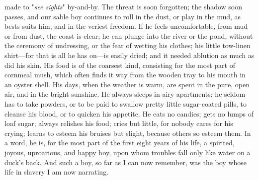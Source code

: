 made to "\emph{see sights}" by-and-by. The threat is soon forgotten; the
shadow soon passes, and our sable boy continues to roll in the dust, or
play in the mud, as bests suits him, and in the veriest freedom. If he
feels uncomfortable, from mud or from dust, the coast is clear; he can
plunge into the river or the pond, without the ceremony of undressing,
or the fear {}of wetting his clothes; his little tow-linen shirt---for
that is all he has on---is easily dried; and it needed ablution as much
as did his skin. His food is of the coarsest kind, consisting for the
most part of cornmeal mush, which often finds it way from the wooden
tray to his mouth in an oyster shell. His days, when the weather is
warm, are spent in the pure, open air, and in the bright sunshine. He
always sleeps in airy apartments; he seldom has to take powders, or to
be paid to swallow pretty little sugar-coated pills, to cleanse his
blood, or to quicken his appetite. He eats no candies; gets no lumps of
loaf sugar; always relishes his food; cries but little, for nobody cares
for his crying; learns to esteem his bruises but slight, because others
so esteem them. In a word, he is, for the most part of the first eight
years of his life, a spirited, joyous, uproarious, and happy boy, upon
whom troubles fall only like water on a duck's back. And such a boy, so
far as I can now remember, was the boy whose life in slavery I am now
narrating.

~
